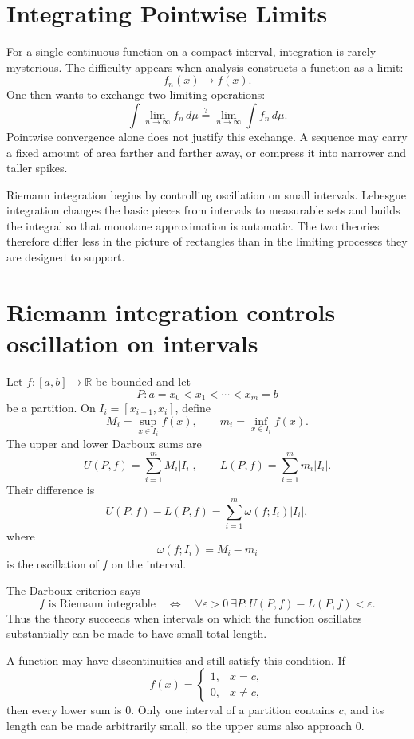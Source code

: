 
\section{Integrating Pointwise Limits}

For a single continuous function on a compact interval, integration is rarely mysterious.  The difficulty appears when analysis constructs a function as a limit:
\[
  f_n(x)\longrightarrow f(x).
\]
One then wants to exchange two limiting operations:
\[
  \int \lim_{n\to\infty}f_n\,d\mu
  \stackrel{?}{=}
  \lim_{n\to\infty}\int f_n\,d\mu.
\]
Pointwise convergence alone does not justify this exchange.  A sequence may carry a fixed amount of area farther and farther away, or compress it into narrower and taller spikes.

Riemann integration begins by controlling oscillation on small intervals.  Lebesgue integration changes the basic pieces from intervals to measurable sets and builds the integral so that monotone approximation is automatic.  The two theories therefore differ less in the picture of rectangles than in the limiting processes they are designed to support.

\section{Riemann integration controls oscillation on intervals}

Let \(f:[a,b]\to\mathbb R\) be bounded and let
\[
  P:a=x_0<x_1<\cdots<x_m=b
\]
be a partition.  On \(I_i=[x_{i-1},x_i]\), define
\[
  M_i=\sup_{x\in I_i}f(x),
  \qquad
  m_i=\inf_{x\in I_i}f(x).
\]
The upper and lower Darboux sums are
\[
  U(P,f)=\sum_{i=1}^m M_i|I_i|,
  \qquad
  L(P,f)=\sum_{i=1}^m m_i|I_i|.
\]
Their difference is
\[
  U(P,f)-L(P,f)
  =\sum_{i=1}^m \omega(f;I_i)|I_i|,
\]
where
\[
  \omega(f;I_i)=M_i-m_i
\]
is the oscillation of \(f\) on the interval.

The Darboux criterion says
\[
  f\text{ is Riemann integrable}
  \quad\Longleftrightarrow\quad
  \forall\varepsilon>0\ \exists P:
  U(P,f)-L(P,f)<\varepsilon.
\]
Thus the theory succeeds when intervals on which the function oscillates substantially can be made to have small total length.

A function may have discontinuities and still satisfy this condition.  If
\[
  f(x)=
  \begin{cases}
    1,&x=c,\\
    0,&x\ne c,
  \end{cases}
\]
then every lower sum is \(0\).  Only one interval of a partition contains \(c\), and its length can be made arbitrarily small, so the upper sums also approach \(0\).

